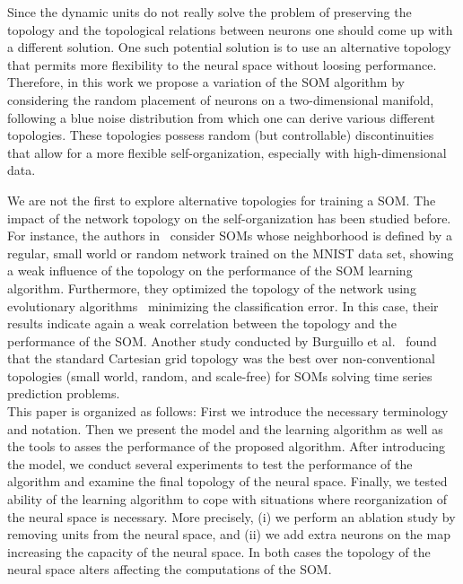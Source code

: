 Since the dynamic units do not really solve the problem of preserving the 
topology and the topological relations between neurons one should come up 
with a different solution. One such potential solution is to use an alternative
topology that permits more flexibility to the neural space without loosing 
performance. 
Therefore, in this work we propose a variation of the SOM algorithm by 
considering the random placement of neurons on a two-dimensional manifold,
following a blue noise distribution from which one can derive various different
topologies. These topologies possess random (but controllable) discontinuities
that allow for a more flexible self-organization, especially with 
high-dimensional data.

We are not the first to explore alternative topologies for training a SOM. 
The impact of the network topology on the self-organization has been studied 
before. For instance, the authors in~\citet{Jiang:2009} consider SOMs whose
neighborhood is defined by a regular, small world or random network trained 
on the MNIST data set, showing a weak influence of the topology on the
performance of the SOM learning algorithm. Furthermore, they optimized the
topology of the network using evolutionary algorithms~\citep{Eiben:2003}
minimizing the classification error. In this case, their results indicate again
a weak correlation between the topology and the performance of the SOM. 
Another study conducted by Burguillo et al.~\citet{Burguillo:2013} found that
the standard Cartesian grid topology was the best over non-conventional
topologies (small world, random, and scale-free) for SOMs solving time series
prediction problems. \\

This paper is organized as follows: First we introduce the necessary
terminology and notation. Then we present the model and the learning algorithm
as well as the tools to asses the performance of the proposed algorithm.
After introducing the model, we conduct several experiments to test the 
performance of the algorithm and examine the final topology of the neural space.
Finally, we tested ability of the learning algorithm to cope with situations 
where reorganization of the neural space is necessary. More precisely, 
(i) we perform an ablation study by removing units from the neural space, and
(ii) we add extra neurons on the map increasing the capacity of the neural
space. In both cases the topology of the neural space alters affecting the 
computations of the SOM.

